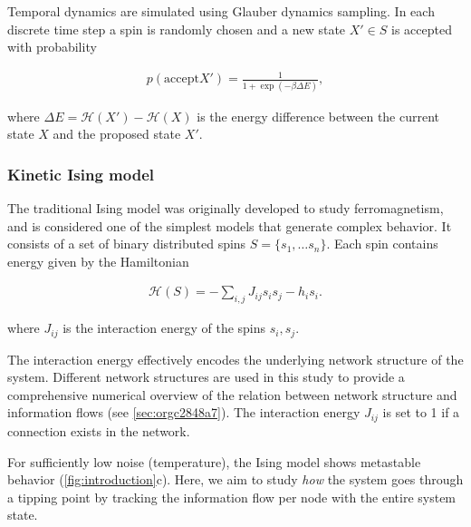 \documentclass[a4paper, 11pt, twocolumn]{article}
\begin{document}
Temporal  dynamics  are  simulated  using  Glauber  dynamics
sampling.  In each  discrete time  step a  spin is  randomly
chosen  and  a   new  state  \(X'\in  S\)   is  accepted  with
probability

\begin{equation}
\label{eq:glauber}
\begin{split}
 p(  \text{accept} X'  ) =  \frac{1}{1 +
\exp(-\beta   \Delta  E)},
\end{split}
\end{equation}

where  \(\Delta E  =  \mathcal{H}(X') -  \mathcal{H}(X)\) is  the
energy difference  between the  current state \(X\)  and the
proposed state \(X'\).

\subsubsection{Kinetic Ising model}
\label{sec:orgb324012}
The  traditional Ising  model  was  originally developed  to
study ferromagnetism, and is  considered one of the simplest
models that generate complex behavior.  It consists of a set
of binary distributed spins \(S = \{s_1, \dots s_n\}\). Each
spin contains energy given by the Hamiltonian

\begin{equation}
\label{eq:energy}
\begin{split}
\mathcal{H}(S) = -\sum_{i,j} J_{ij} s_{i} s_{j} - h_{i} s_{i}.
\end{split}
\end{equation}

where  \(J_{ij}\) is  the  interaction energy  of the  spins
\(s_i, s_j\).

The  interaction energy  effectively encodes  the underlying
network   structure  of   the   system.  Different   network
structures are used in this study to provide a comprehensive
numerical overview of the relation between network structure
and  information   flows  (see  \ref{sec:orgc2848a7}).  The
interaction energy  \(J_{ij}\) is set  to 1 if  a connection
exists in the network.

For sufficiently  low noise  (temperature), the  Ising model
shows   metastable  behavior   (\cref{fig:introduction}{c}).
Here,  we aim  to  study  \emph{how} the  system  goes through  a
tipping point by tracking the information flow per node with
the entire system state.
\end{document}
